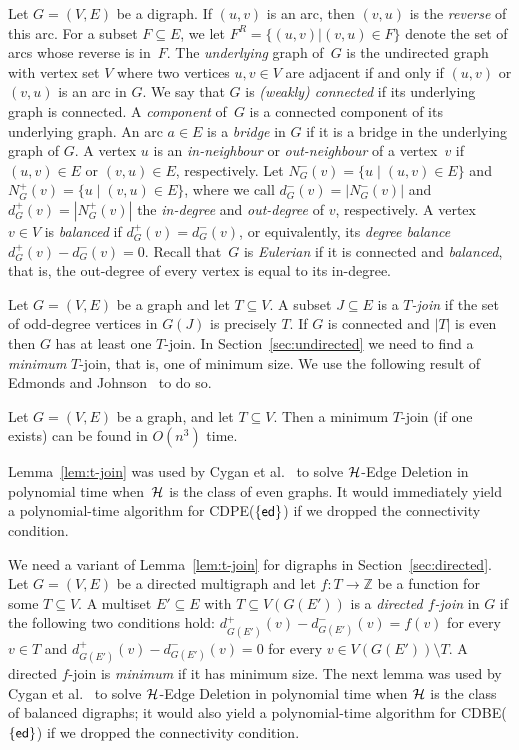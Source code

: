 \documentclass[11pt]{llncs}
\newcommand{\ed}{{\sf ed}}
\newcommand{\cdpe}{{\sc CDPE}}
\newcommand{\cdbe}{{\sc CDBE}}
\begin{document}
Let $G=(V,E)$ be a digraph.  If $(u,v)$ is an arc, then $(v,u)$ is the {\em
reverse} of this arc.  For a subset $F\subseteq E$, we let $F^R=\{(u,v) | (v,u)
\in F\}$ denote the set of arcs whose reverse is in~$F$.  The \emph{underlying}
graph of~$G$ is the undirected graph with vertex set $V$ where two vertices
$u,v\in V$ are adjacent if and only if $(u,v)$ or $(v,u)$ is an arc in $G$.  We
say that $G$ is \emph{(weakly) connected} if its underlying graph is connected.
A {\em component} of~$G$ is a connected component of its underlying graph.  An
arc $a\in E$ is a \emph{bridge} in $G$ if it is a bridge in the underlying
graph of $G$.  A vertex $u$ is an \emph{in-neighbour} or \emph{out-neighbour}
of a vertex~$v$ if $(u,v)\in E$ or $(v,u)\in E$, respectively. Let
$N_G^-(v)=\{u\mid (u,v)\in E\}$ and $N_G^+(v)=\{u\mid (v,u)\in E\}$, where we
call $d_G^-(v)=|N_G^-(v)|$ and $d_G^+(v)=|N_G^+(v)|$ the \emph{in-degree} and
\emph{out-degree} of $v$, respectively. 
A vertex $v\in V$ is {\em balanced} if $d_G^+(v)=d_G^-(v)$, 
or equivalently, its {\em degree balance} $d_G^+(v)-d_G^-(v)=0$.
Recall that~$G$ is {\em Eulerian} if it
is connected and {\em balanced}, that is, the out-degree of every vertex is
equal to its in-degree. 

Let $G=(V,E)$ be a graph and let $T\subseteq V$. A subset $J \subseteq E$ is a
\emph{$T$-join} if the set of odd-degree vertices in $G(J)$ is precisely $T$.
If $G$ is connected and $|T|$ is even then $G$ has at least one $T$-join. In
Section~\ref{sec:undirected} we need to find a {\em minimum} $T$-join, that is,
one of minimum size. We use the following result of Edmonds and Johnson~\cite{EdmondsJ73} to do
so.

\begin{lemma}\label{lem:t-join}
Let $G=(V,E)$ be  a graph, and let $T\subseteq V$.  Then a minimum $T$-join (if
one exists) can be found in $O(n^3)$ time. 
\end{lemma}
Lemma~\ref{lem:t-join} was used by Cygan et al.~\cite{CyganMPPS14} to solve
${\cal H}$-{\sc Edge Deletion} in polynomial time when~${\cal H}$ is the class
of even graphs. It would  immediately yield a polynomial-time algorithm for
\cdpe($\{\ed\}$) if we dropped the connectivity condition.

We need a variant of Lemma~\ref{lem:t-join} for digraphs in
Section~\ref{sec:directed}.  Let $G=(V,E)$ be a directed multigraph and let $f:
T\rightarrow \mathbb{Z}$ be a function for some $T\subseteq V$.  A multiset
$E'\subseteq E$ with $T\subseteq V(G(E'))$ is a {\em directed $f$-join} in $G$
if the following two conditions hold: 
$d_{G(E')}^+(v)-d_{G(E')}^-(v)=f(v)$ for
every $v \in T$ and $d_{G(E')}^+(v)-d_{G(E')}^-(v)=0$ for every $v\in
V(G(E'))\setminus T$.  A directed $f$-join is {\em minimum} if it has minimum
size.  The next lemma was used by Cygan et al.~\cite{CyganMPPS14} to solve
${\cal H}$-{\sc Edge Deletion} in polynomial time when ${\cal H}$ is the class
of balanced digraphs; it would also yield a polynomial-time algorithm for
\cdbe($\{\ed\}$) if we dropped the connectivity condition. 
\end{document}
